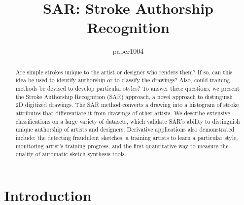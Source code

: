 \documentclass{egpubl}
\title[SAR: Stroke Authorship Recognition]%
      {SAR: Stroke Authorship Recognition}
\author[paper1004]
     {paper1004}
\begin{document}

\maketitle

\begin{abstract}
Are simple strokes unique to the artist or designer who renders them? If so, can this idea be used to identify authorship or to classify the drawings? Also, could training methods be devised to develop particular styles? To answer these questions, we present the Stroke Authorship Recognition (SAR) approach, a novel approach to distinguish 2D digitized drawings. The SAR method converts a drawing into a histogram of stroke attributes that differentiate it from drawings of other artists. We describe extensive classifications on a large variety of datasets, which validate SAR's ability to distinguish unique authorship of artists and designers. Derivative applications also demonstrated include: the detecting fraudulent sketches, a training artists to learn a particular style, monitoring artist's training progress, and the first quantitative way to measure the quality of automatic sketch synthesis tools.\vspace{-1mm}
\end{abstract}
\vspace{-5mm}
\section{Introduction}
\vspace{-2mm}


\vspace{-3mm}
\end{document}
